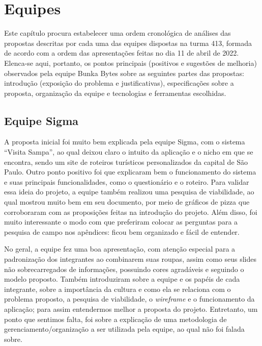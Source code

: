 
\chapter{Equipes}
Este capítulo procura estabelecer uma ordem cronológica de análises das propostas descritas por cada uma das equipes dispostas na turma 413, formada de acordo com a ordem das apresentações feitas no dia 11 de abril de 2022. Elenca-se aqui, portanto, os pontos principais (positivos e sugestões de melhoria) observados pela equipe Bunka Bytes sobre as seguintes partes das propostas: introdução (exposição do problema e justificativas), especificações sobre a proposta, organização da equipe e tecnologias e ferramentas escolhidas.

\section{Equipe Sigma}
A proposta inicial foi muito bem explicada pela equipe Sigma, com o sistema “Visita Sampa”, ao qual deixou claro o intuito da aplicação e o nicho em que se encontra, sendo um site de roteiros turísticos personalizados da capital de São Paulo. Outro ponto positivo foi que explicaram bem o funcionamento do sistema e suas principais funcionalidades, como o questionário e o roteiro. Para validar essa ideia do projeto, a equipe também realizou uma pesquisa de viabilidade, ao qual mostrou muito bem em seu documento, por meio de gráficos de pizza que corroboraram com as proposições feitas na introdução do projeto. Além disso, foi muito interessante o modo com que preferiram colocar as perguntas para a pesquisa de campo nos apêndices: ficou bem organizado e fácil de entender.

No geral, a equipe fez uma boa apresentação, com atenção especial para a padronização dos integrantes ao combinarem suas roupas, assim como seus slides não sobrecarregados de informações, possuindo cores agradáveis e seguindo o modelo proposto. Também introduziram sobre a equipe e os papéis de cada integrante, sobre a importância da cultura e como ela se relaciona com o problema proposto, a pesquisa de viabilidade, o \textsl{wireframe} e o funcionamento da aplicação; para assim entendermos melhor a proposta do projeto. Entretanto, um ponto que sentimos falta, foi sobre a explicação de uma metodologia de gerenciamento/organização a ser utilizada pela equipe, ao qual não foi falada sobre.

